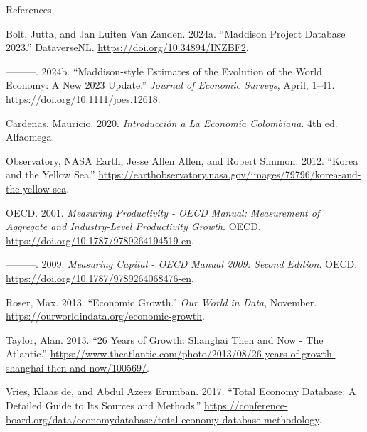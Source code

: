 \documentclass[
  ignorenonframetext,
]{beamer}
\newlength{\cslhangindent}
\newenvironment{CSLReferences}[2] %
 {\begin{list}{}{%
  \setlength{\itemindent}{0pt}
  \setlength{\leftmargin}{0pt}
  \setlength{\parsep}{0pt}
  \ifodd #1
   \setlength{\leftmargin}{\cslhangindent}
   \setlength{\itemindent}{-1\cslhangindent}
  \fi
  \setlength{\itemsep}{#2\baselineskip}}}
 {\end{list}}
\begin{document}
\begin{frame}[allowframebreaks]{References}
\label{refs}
\begin{CSLReferences}{1}{0}
Bolt, Jutta, and Jan Luiten Van Zanden. 2024a. {``Maddison {Project}
{Database} 2023.''} DataverseNL. \url{https://doi.org/10.34894/INZBF2}.

---------. 2024b. {``Maddison‐style Estimates of the Evolution of the
World Economy: {A} New 2023 Update.''} \emph{Journal of Economic
Surveys}, April, 1--41. \url{https://doi.org/10.1111/joes.12618}.

Cardenas, Mauricio. 2020. \emph{Introducción a La {Economía}
{Colombiana}}. 4th ed. Alfaomega.

Observatory, NASA Earth, Jesse Allen Allen, and Robert Simmon. 2012.
{``Korea and the {Yellow} {Sea}.''}
\url{https://earthobservatory.nasa.gov/images/79796/korea-and-the-yellow-sea}.

OECD. 2001. \emph{Measuring {Productivity} - {OECD} {Manual}:
{Measurement} of {Aggregate} and {Industry}-Level {Productivity}
{Growth}}. OECD. \url{https://doi.org/10.1787/9789264194519-en}.

---------. 2009. \emph{Measuring {Capital} - {OECD} {Manual} 2009:
{Second} Edition}. OECD. \url{https://doi.org/10.1787/9789264068476-en}.

Roser, Max. 2013. {``Economic {Growth}.''} \emph{Our World in Data},
November. \url{https://ourworldindata.org/economic-growth}.

Taylor, Alan. 2013. {``26 {Years} of {Growth}: {Shanghai} {Then} and
{Now} - {The} {Atlantic}.''}
\url{https://www.theatlantic.com/photo/2013/08/26-years-of-growth-shanghai-then-and-now/100569/}.

Vries, Klaas de, and Abdul Azeez Erumban. 2017. {``Total {Economy}
{Database}: {A} Detailed Guide to Its Sources and Methods.''}
\url{https://conference-board.org/data/economydatabase/total-economy-database-methodology}.

\end{CSLReferences}
\end{frame}
\end{document}

